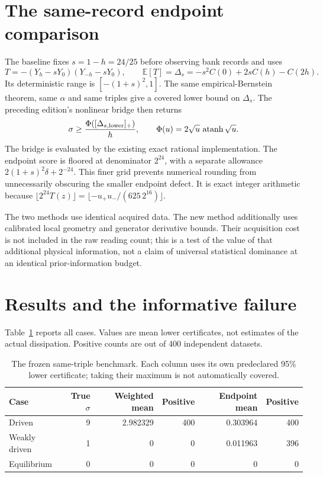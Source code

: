 \section{The same-record endpoint comparison}
The baseline fixes $s=1-h=24/25$ before observing bank records and uses
\begin{equation}
 T=-(Y_h-sY_0)(Y_{-h}-sY_0),\qquad
 \mathbb E[T]=\Delta_s=-s^2C(0)+2sC(h)-C(2h).
\end{equation}
Its deterministic range is $[-(1+s)^2,1]$. The same empirical-Bernstein theorem,
same $\alpha$ and same triples give a covered lower bound on $\Delta_s$.
The preceding edition's nonlinear bridge then returns
\begin{equation}
 \sigma\ge\frac{\Phi([\Delta_{s,\rm lower}]_+)}{h},\qquad
 \Phi(u)=2\sqrt u\,\operatorname{atanh}\sqrt u.
\end{equation}
The bridge is evaluated by the existing exact rational implementation. The
endpoint score is floored at denominator $2^{24}$, with a separate allowance
$2(1+s)^2\delta+2^{-24}$. This finer grid prevents numerical rounding from
unnecessarily obscuring the smaller endpoint defect. It is exact integer
arithmetic because
$\lfloor 2^{24}T(z)\rfloor=\lfloor-u_+u_-/(625\,2^{16})\rfloor$.

The two methods use identical acquired data. The new method additionally
uses calibrated local geometry and generator derivative bounds. Their
acquisition cost is not included in the raw reading count; this is a test of
the value of that additional physical information, not a claim of universal
statistical dominance at an identical prior-information budget.

\section{Results and the informative failure}
Table~\ref{tab:og-frozen} reports all cases. Values are mean lower certificates,
not estimates of the actual dissipation. Positive counts are out of 400
independent datasets.
\begin{table}[htbp]
\centering
\begin{tabular}{lrrrrr}
\hline
Case & True $\sigma$ & Weighted mean & Positive & Endpoint mean & Positive\\
\hline
Driven & 9 & 2.982329 & 400 & 0.303964 & 400\\
Weakly driven & 1 & 0 & 0 & 0.011963 & 396\\
Equilibrium & 0 & 0 & 0 & 0 & 0\\
\hline
\end{tabular}
\caption{The frozen same-triple benchmark. Each column uses its own predeclared
95\% lower certificate; taking their maximum is not automatically covered.}
\label{tab:og-frozen}
\end{table}

